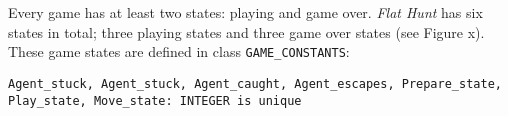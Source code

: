 Every game has at least two states: playing and game over. \emph{Flat Hunt} has six states in total; three playing states and three game over states (see Figure x). These game states are defined in class \texttt{GAME\_CONSTANTS}:

\texttt{Agent\_stuck, Agent\_stuck, Agent\_caught, Agent\_escapes, Prepare\_state, Play\_state, Move\_state: INTEGER is unique}

